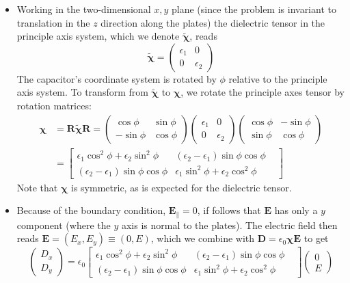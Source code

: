 \documentclass[11pt, a4paper]{article}
\renewcommand{\vec}[1]{\bm{#1}} %
\newcommand{\mat}[1]{\mathbf{#1}} %
\renewcommand{\t}[1]{\tilde{#1}} %
\newcommand{\E}{\vec{E}}  %
\newcommand{\D}{\vec{D}}  %
\newcommand{\e}{\epsilon}
\newcommand{\ee}{\epsilon_{0}}  %
\newcommand{\eee}{\bm{\chi}}  %
\begin{document}
\begin{itemize}
	\item Working in the two-dimensional $ x, y $ plane (since the problem is invariant to translation in the $ z $ direction along the plates) the dielectric tensor in the principle axis system, which we denote $ \t{\eee} $, reads
	\begin{equation*}
		\t{\eee} = 
		\begin{pmatrix}
			\e_{1} & 0\\
			0 & \e_{2}
		\end{pmatrix}
	\end{equation*}
	The capacitor's coordinate system is rotated by $ \phi $ relative to the principle axis system. To transform from $ \t{\eee} $ to $ \eee $, we rotate the principle axes tensor by rotation matrices:
	\begin{align*}
		\eee &= \mat{R} \t{\eee} \mat{R} = 
		\begin{pmatrix}
			\cos \phi & \sin \phi\\
			- \sin \phi & \cos \phi
		\end{pmatrix}
		\begin{pmatrix}
			\e_{1} & 0\\
			0 & \e_{2}
		\end{pmatrix}
		\begin{pmatrix}
			\cos \phi & - \sin \phi\\
			\sin \phi & \cos \phi
		\end{pmatrix}\\
		& = 
		\begin{bmatrix}
			\e_{1} \cos^{2}\phi + \e_{2} \sin^{2}\phi & (\e_{2} - \e_{1})\sin \phi \cos \phi \\
			(\e_{2} - \e_{1})\sin \phi \cos \phi & \e_{1} \sin^{2}\phi + \e_{2} \cos^{2}\phi &
		\end{bmatrix}
	\end{align*}
	Note that $ \eee $ is symmetric, as is expected for the dielectric tensor.
	
	\item Because of the boundary condition, $ \E_{\parallel} = 0 $, if follows that $ \E $ has only a $ y $ component (where the $ y $ axis is normal to the plates). The electric field then reads $ \E = (E_{x}, E_{y}) \equiv (0, E) $, which we combine with $ \D = \ee \eee \E $ to get
	\begin{equation*}
		\begin{pmatrix}
			D_{x}\\
			D_{y}
		\end{pmatrix}
		 = 
		 \ee 
 		\begin{bmatrix}
 			\e_{1} \cos^{2}\phi + \e_{2} \sin^{2}\phi & (\e_{2} - \e_{1})\sin \phi \cos \phi \\
 			(\e_{2} - \e_{1})\sin \phi \cos \phi & \e_{1} \sin^{2}\phi + \e_{2} \cos^{2}\phi &
 		\end{bmatrix}
		\begin{pmatrix}
			0\\
			E
		\end{pmatrix}
	\end{equation*}
	

\end{itemize}
\end{document}
